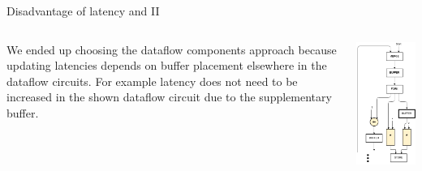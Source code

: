 \documentclass{beamer}
\begin{document}
\begin{frame}{Disadvantage of latency and II}
    \begin{columns}[T]
    \begin{column}{0.45\textwidth}
We ended up choosing the dataflow components approach because updating latencies depends on buffer placement elsewhere in the dataflow circuits. For example latency does not need to be increased in the shown dataflow circuit due to the supplementary buffer.    
    \end{column}
    \begin{column}{0.45\textwidth}
    \begin{center}
     \includegraphics[scale=0.28]{latency_with_buffer.png}
    \end{center}
    \end{column}
\end{columns}
\end{frame}
\end{document}
